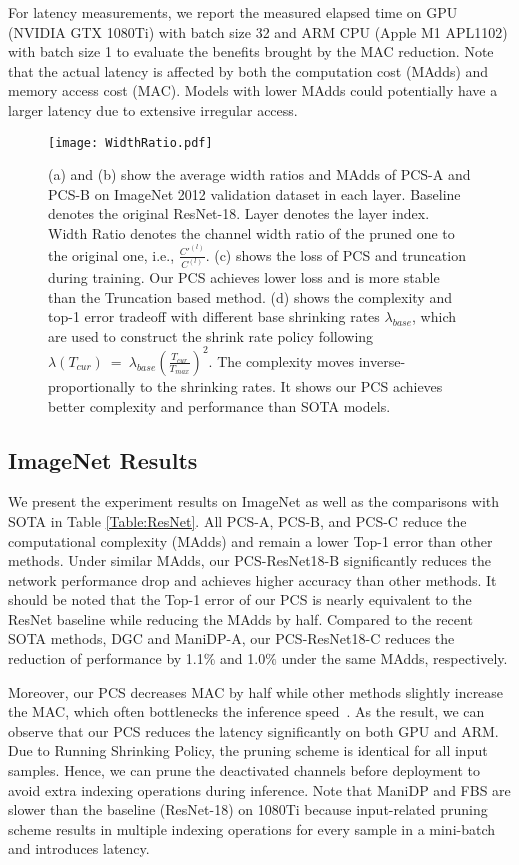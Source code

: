 \documentclass[lettersize,journal]{IEEEtran}
\begin{document}
For latency measurements, we report the measured elapsed time on GPU (NVIDIA GTX 1080Ti) with batch size 32 and ARM CPU (Apple M1 APL1102) with batch size 1 to evaluate the benefits brought by the MAC reduction. Note that the actual latency is affected by both the computation cost (MAdds) and memory access cost (MAC). Models with lower MAdds could potentially have a larger latency due to extensive irregular access.


\begin{figure*}[t]
  \center
  \texttt{[image: WidthRatio.pdf]}
  \vspace{-5mm}
  \caption{ (a) and (b) show the average width ratios and MAdds of PCS-A and PCS-B on ImageNet 2012 validation dataset in each layer. Baseline denotes the original ResNet-18. Layer denotes the layer index. Width Ratio denotes the channel width ratio of the pruned one to the original one, i.e.,  $\frac{C'^{(l)}}{C^{(l)}}$. (c) shows the loss of PCS and truncation during training. Our PCS achieves lower loss and is more stable than the Truncation based method. 
  (d) shows the complexity and top-1 error tradeoff with different base shrinking rates $\lambda_{base}$, which are used to construct the shrink rate policy following  $\lambda(T_{cur})~=~\lambda_{base}(\frac{T_{cur}}{T_{max}})^2$. The complexity moves inverse-proportionally to the shrinking rates. 
  It shows our PCS achieves better complexity and performance than SOTA models. }
  \label{Width Ratio}  
  \vspace{-5mm}
\end{figure*} 


\subsection{ImageNet Results}
We present the experiment results on ImageNet as well as the comparisons with SOTA in Table \ref{Table:ResNet}. All PCS-A, PCS-B, and PCS-C reduce the computational complexity (MAdds) and remain a lower Top-1 error than other methods. Under similar MAdds, our PCS-ResNet18-B significantly reduces the network performance drop and achieves higher accuracy than other methods. It should be noted that the Top-1 error of our PCS is nearly equivalent to the ResNet baseline while reducing the MAdds by half. Compared to the recent SOTA methods, DGC and ManiDP-A, our PCS-ResNet18-C reduces the reduction of performance by 1.1$\%$ and 1.0$\%$ under the same MAdds, respectively. 

Moreover, our PCS decreases MAC by half while other methods slightly increase the MAC, which often bottlenecks the inference speed~\cite{ma2018shufflenet}. As the result, we can observe that our PCS reduces the latency significantly on both GPU and ARM. Due to Running Shrinking Policy, the pruning scheme is identical for all input samples. Hence, we can prune the deactivated channels before deployment to avoid extra indexing operations during inference. 
Note that ManiDP and FBS are slower than the baseline (ResNet-18) on 1080Ti because input-related pruning scheme results in multiple indexing operations for every sample in a mini-batch and introduces latency. 
\end{document}
